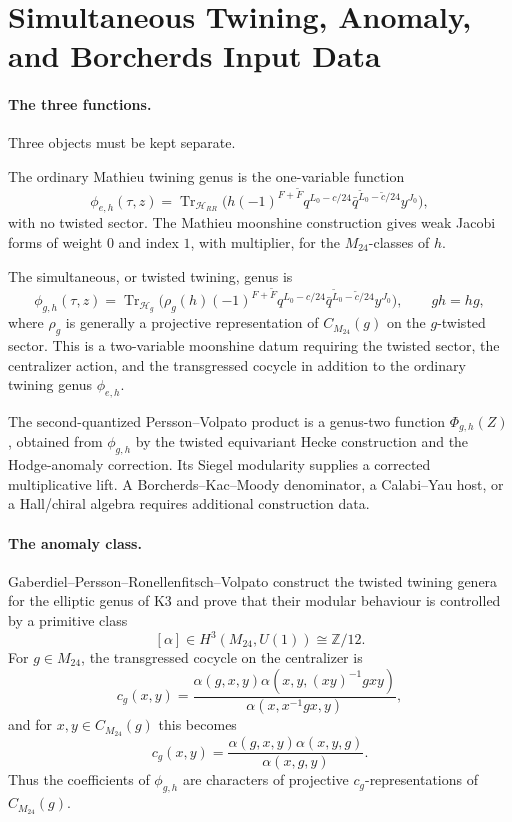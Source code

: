 \providecommand{\CMg}{C_{M_{24}}}
\providecommand{\Hg}{\mathcal H_g}
\providecommand{\Zgh}{\phi_{g,h}}
\providecommand{\PhiGH}{\Phi_{g,h}}
\providecommand{\PhiN}{\Phi_N}
\providecommand{\DeltaFive}{\Delta_5}
\providecommand{\kBKM}{\kappa_{\mathrm{BKM}}}
\providecommand{\kch}{\kappa_{\mathrm{ch}}}
\providecommand{\kcat}{\kappa_{\mathrm{cat}}}
\providecommand{\kfib}{\kappa_{\mathrm{fiber}}}
\providecommand{\Spfour}{\mathrm{Sp}_4}
\providecommand{\Jac}{\mathrm{Jac}}
\providecommand{\wt}{\operatorname{wt}}

\section*{Simultaneous Twining, Anomaly, and Borcherds Input Data}

\paragraph{The three functions.}
Three objects must be kept separate.

The ordinary Mathieu twining genus is the one-variable function
\[
  \phi_{e,h}(\tau,z)
  =\operatorname{Tr}_{\mathcal H_{RR}}
    \bigl(h(-1)^{F+\widetilde F}q^{L_0-c/24}
    \bar q^{\widetilde L_0-\widetilde c/24}y^{J_0}\bigr),
\]
with no twisted sector.  The Mathieu moonshine construction gives
weak Jacobi forms of weight \(0\) and index \(1\), with multiplier,
for the \(M_{24}\)-classes of \(h\).

The simultaneous, or twisted twining, genus is
\[
  \Zgh(\tau,z)
  =\operatorname{Tr}_{\Hg}
    \bigl(\rho_g(h)(-1)^{F+\widetilde F}q^{L_0-c/24}
    \bar q^{\widetilde L_0-\widetilde c/24}y^{J_0}\bigr),
  \qquad gh=hg,
\]
where \(\rho_g\) is generally a projective representation of
\(\CMg(g)\) on the \(g\)-twisted sector.  This is a two-variable
moonshine datum requiring the twisted sector, the centralizer action,
and the transgressed cocycle in addition to the ordinary twining genus
\(\phi_{e,h}\).

The second-quantized Persson--Volpato product is a genus-two function
\(\PhiGH(Z)\), obtained from \(\Zgh\) by the twisted equivariant Hecke
construction and the Hodge-anomaly correction.  Its Siegel modularity
supplies a corrected multiplicative lift.  A Borcherds--Kac--Moody
denominator, a Calabi--Yau host, or a Hall/chiral algebra requires
additional construction data.

\paragraph{The anomaly class.}
Gaberdiel--Persson--Ronellenfitsch--Volpato construct the twisted
twining genera for the elliptic genus of K3 and prove that their
modular behaviour is controlled by a primitive class
\[
  [\alpha]\in H^3(M_{24},U(1))\cong\mathbb Z/12 .
\]
For \(g\in M_{24}\), the transgressed cocycle on the centralizer is
\[
  c_g(x,y)
  =\frac{\alpha(g,x,y)\alpha(x,y,(xy)^{-1}gxy)}
    {\alpha(x,x^{-1}gx,y)} ,
\]
and for \(x,y\in\CMg(g)\) this becomes
\[
  c_g(x,y)
  =\frac{\alpha(g,x,y)\alpha(x,y,g)}{\alpha(x,g,y)} .
\]
Thus the coefficients of \(\Zgh\) are characters of projective
\(c_g\)-representations of \(\CMg(g)\).

